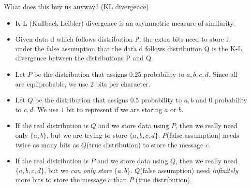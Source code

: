 \documentclass[8pt]{beamer}
\begin{document}
\begin{frame}{What does this buy us anyway? (KL divergence)}
\begin{itemize}
 \item K-L (Kullback Leibler) divergence is an asymmetric measure of similarity.
 \item Given data d which follows distribution P, the extra bits need to store
    it under the false assumption that the data d follows distribution Q is the K-L divergence
    between the distributions P and Q.
\item Let $P$ be the distribution that assigns $0.25$ probability to $a, b, c, d$. Since all are equiprobable, we use $2$ bits per character.
\item Let $Q$ be the distribution that assigns $0.5$ probability to $a, b$ and $0$ probability to $c, d$. We use $1$ bit to represent if we are storing $a$ or $b$.
\item If the real distribution is $Q$ and we store data using $P$, then we really need only $\{a, b\}$, but we are trying to store $\{a, b, c, d\}$. $P$(false assumption) needs
  twice as many bits as $Q$(true distribution) to store the message $c$.
\item If the real distribution is $P$ and we store data using $Q$, then we really need $\{a, b, c, d\}$, but we \emph{can only store} $\{a, b\}$. $Q$(false assumption)
  need \emph{infinitely} more bits to store the message $c$ than $P$ (true distribution).
\end{itemize}
\end{frame}
\end{document}
